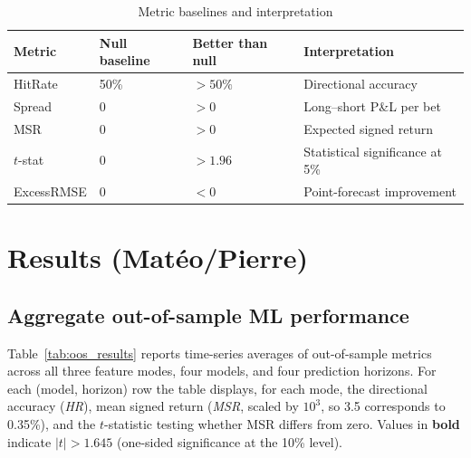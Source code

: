 \documentclass{article}
\begin{document}
\begin{table}[H]
\centering
\caption{Metric baselines and interpretation}
\label{tab:metric_baselines}
\begin{tabular}{llll}
\toprule
\textbf{Metric}        & \textbf{Null baseline} & \textbf{Better than null} & \textbf{Interpretation} \\
\midrule
HitRate         & 50\%  & $> 50\%$  & Directional accuracy \\
Spread          & 0     & $> 0$     & Long--short P\&L per bet \\
MSR             & 0     & $> 0$     & Expected signed return \\
$t$-stat        & 0     & $> 1.96$  & Statistical significance at 5\% \\
ExcessRMSE      & 0     & $< 0$     & Point-forecast improvement \\
\bottomrule
\end{tabular}
\end{table}


\section{Results (Matéo/Pierre)}

\subsection{Aggregate out-of-sample ML performance}
\label{sec:oos_results}

Table~\ref{tab:oos_results} reports time-series averages of out-of-sample metrics across all three feature modes, four models, and four prediction horizons. For each (model, horizon) row the table displays, for each mode, the directional accuracy (\textit{HR}), mean signed return (\textit{MSR}, scaled by $10^{3}$, so 3.5 corresponds to 0.35\%), and the $t$-statistic testing whether MSR differs from zero. Values in \textbf{bold} indicate $|t|>1.645$ (one-sided significance at the 10\% level).
\end{document}
